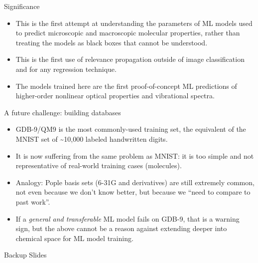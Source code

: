 \documentclass[xetex,compress]{beamer}
\begin{document}
\begin{frame}{Significance}
  \begin{itemize}
  \item This is the first attempt at understanding the parameters of ML models used to predict microscopic and macroscopic molecular properties, rather than treating the models as black boxes that cannot be understood.
  \item This is the first use of relevance propagation outside of image classification and for any regression technique.
  \item The models trained here are the first proof-of-concept ML predictions of higher-order nonlinear optical properties and vibrational spectra.
  \end{itemize}
\end{frame}

\begin{frame}{A future challenge: building databases}
  \begin{itemize}
  \item GDB-9/QM9 is the most commonly-used training set, the equivalent of the MNIST set of \textasciitilde{}10,000 labeled handwritten digits.
  \item It is now suffering from the same problem as MNIST: it is too simple and not representative of real-world training cases (molecules).
  \item Analogy: Pople basis sets (6-31G and derivatives) are still extremely common, not even because we don't know better, but because we ``need to compare to past work''.
  \item If a \emph{general and transferable} ML model fails on GDB-9, that is a warning sign, but the above cannot be a reason against extending deeper into chemical space for ML model training.
  \end{itemize}
\end{frame}

\begin{frame}{Backup Slides}
\end{frame}
\end{document}
